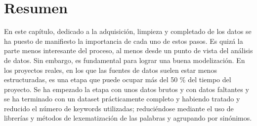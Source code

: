 \section{Resumen}

En este capítulo, dedicado a la adquisición, limpieza y completado de los datos se ha puesto de manifiesto la importancia de cada uno de estos pasos. Es quizá la parte menos interesante del proceso, al menos desde un punto de vista del análisis de datos. Sin embargo, es fundamental para lograr una buena modelización. En los proyectos reales, en los que las fuentes de datos suelen estar menos estructuradas, es una etapa que puede ocupar más del 50 \% del tiempo del proyecto. Se ha empezado la etapa con unos datos brutos y con datos faltantes y se ha terminado con un dataset prácticamente completo y habiendo tratado y reducido el número de keywords utilizadas; reduciéndose mediante el uso de librerías y métodos de lexematización de las palabras y agrupando por sinónimos.